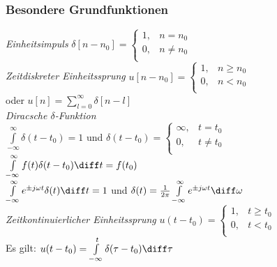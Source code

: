 \documentclass[6pt,a4paper]{scrartcl}
\begin{document}
\begin{multicols}{4}
	\subsubsection{Besondere Grundfunktionen}
	\emph{Einheitsimpuls} $\delta[n - n_0] = \begin{cases}
		1, & n = n_0\\
		0, & n \neq n_0\\
	\end{cases}$\\
	\emph{Zeitdiskreter Einheitssprung} $u[n - n_0] = \begin{cases}
		1, & n \geq n_0\\
		0, & n < n_0\\
	\end{cases}$\\
	oder $u[n] = \sum\limits_{l=0}^{\infty}{\delta[n - l]}$\\
	\emph{Diracsche $\delta$-Funktion}\\
	$\int\limits_{-\infty}^{\infty}{\delta(t - t_0)} = 1$ und $\delta(t - t_0) = \begin{cases} %
		\infty, & t = t_0\\
		0, & t \neq t_0\\
	\end{cases}$\\
	$\int\limits_{-\infty}^{\infty}{f(t)\delta(t - t_0)\diff t} = f(t_0)$\\
	$\int\limits_{-\infty}^{\infty}{e^{\pm j \omega t}\delta(t) \diff t} = 1$ und $\delta(t) = \frac{1}{2 \pi}\int\limits_{-\infty}^{\infty}{e^{\pm j \omega t}\diff \omega}$\\
	\emph{Zeitkontinuierlicher Einheitssprung} $u(t - t_0) = \begin{cases}
		1, & t \geq t_0\\
		0, & t < t_0\\
	\end{cases}$\\
	Es gilt: $u(t - t_0) = \int\limits_{-\infty}^{t}{\delta(\tau - t_0)\diff\tau}$
%	
%	
%	
	

\end{multicols}
\end{document}
